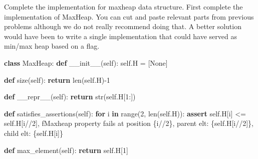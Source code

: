 \documentclass[
]{article}
\newenvironment{Shaded}{}{}
\newcommand{\BuiltInTok}[1]{\textcolor[rgb]{0.00,0.50,0.00}{#1}}
\newcommand{\ControlFlowTok}[1]{\textcolor[rgb]{0.00,0.44,0.13}{\textbf{#1}}}
\newcommand{\DecValTok}[1]{\textcolor[rgb]{0.25,0.63,0.44}{#1}}
\newcommand{\FunctionTok}[1]{\textcolor[rgb]{0.02,0.16,0.49}{#1}}
\newcommand{\KeywordTok}[1]{\textcolor[rgb]{0.00,0.44,0.13}{\textbf{#1}}}
\newcommand{\NormalTok}[1]{#1}
\newcommand{\OperatorTok}[1]{\textcolor[rgb]{0.40,0.40,0.40}{#1}}
\newcommand{\SpecialCharTok}[1]{\textcolor[rgb]{0.25,0.44,0.63}{#1}}
\newcommand{\SpecialStringTok}[1]{\textcolor[rgb]{0.73,0.40,0.53}{#1}}
\newcommand{\VariableTok}[1]{\textcolor[rgb]{0.10,0.09,0.49}{#1}}
\begin{document}
Complete the implementation for maxheap data structure. First complete
the implementation of MaxHeap. You can cut and paste relevant parts from
previous problems although we do not really recommend doing that. A
better solution would have been to write a single implementation that
could have served as min/max heap based on a flag.

\begin{Shaded}
\begin{Highlighting}[]
\KeywordTok{class}\NormalTok{ MaxHeap:}
    \KeywordTok{def} \FunctionTok{\_\_init\_\_}\NormalTok{(}\VariableTok{self}\NormalTok{):}
        \VariableTok{self}\NormalTok{.H }\OperatorTok{=}\NormalTok{ [}\VariableTok{None}\NormalTok{]}

    \KeywordTok{def}\NormalTok{ size(}\VariableTok{self}\NormalTok{):}
        \ControlFlowTok{return} \BuiltInTok{len}\NormalTok{(}\VariableTok{self}\NormalTok{.H)}\OperatorTok{{-}}\DecValTok{1}

    \KeywordTok{def} \FunctionTok{\_\_repr\_\_}\NormalTok{(}\VariableTok{self}\NormalTok{):}
        \ControlFlowTok{return} \BuiltInTok{str}\NormalTok{(}\VariableTok{self}\NormalTok{.H[}\DecValTok{1}\NormalTok{:])}

    \KeywordTok{def}\NormalTok{ satisfies\_assertions(}\VariableTok{self}\NormalTok{):}
        \ControlFlowTok{for}\NormalTok{ i }\KeywordTok{in} \BuiltInTok{range}\NormalTok{(}\DecValTok{2}\NormalTok{, }\BuiltInTok{len}\NormalTok{(}\VariableTok{self}\NormalTok{.H)):}
            \ControlFlowTok{assert} \VariableTok{self}\NormalTok{.H[i] }\OperatorTok{\textless{}=} \VariableTok{self}\NormalTok{.H[i}\OperatorTok{//}\DecValTok{2}\NormalTok{],  }\SpecialStringTok{f\textquotesingle{}Maxheap property fails at position }\SpecialCharTok{\{}\NormalTok{i}\OperatorTok{//}\DecValTok{2}\SpecialCharTok{\}}\SpecialStringTok{, parent elt: }\SpecialCharTok{\{}\VariableTok{self}\SpecialCharTok{.}\NormalTok{H[i}\OperatorTok{//}\DecValTok{2}\NormalTok{]}\SpecialCharTok{\}}\SpecialStringTok{, child elt: }\SpecialCharTok{\{}\VariableTok{self}\SpecialCharTok{.}\NormalTok{H[i]}\SpecialCharTok{\}}\SpecialStringTok{\textquotesingle{}}

    \KeywordTok{def}\NormalTok{ max\_element(}\VariableTok{self}\NormalTok{):}
        \ControlFlowTok{return} \VariableTok{self}\NormalTok{.H[}\DecValTok{1}\NormalTok{]}


\end{Highlighting}
\end{Shaded}
\end{document}
